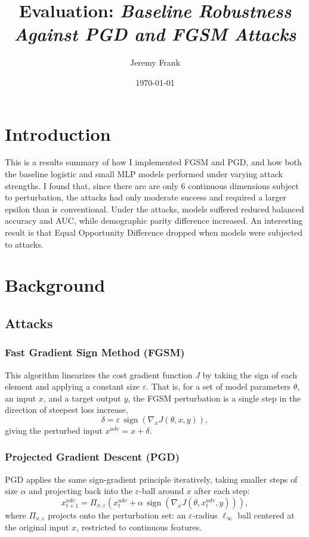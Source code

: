\documentclass[11pt]{article}
\title{Evaluation: \textit{Baseline Robustness Against PGD and FGSM Attacks}}
\author{Jeremy Frank}
\date{\today}
\begin{document}
\maketitle

\section*{Introduction}

This is a results summary of how I implemented FGSM and PGD, and how both the baseline logistic and small MLP models performed under varying attack strengths. I found that, since there are are only 6 continuous dimensions subject to perturbation, the attacks had only moderate success and required a larger epsilon than is conventional. Under the attacks, models suffered reduced balanced accuracy and AUC, while demographic parity difference increased. An interesting result is that Equal Opportunity Difference dropped when models were subjected to attacks.

\section*{Background}

\subsection*{Attacks}

\subsubsection*{Fast Gradient Sign Method (FGSM)}

This algorithm linearizes the cost gradient function $J$ by taking the sign of each element and applying a constant size $\varepsilon$. That is, for a set of model parameters $\theta$, an input $x$, and a target output $y$, the FGSM perturbation is a single step in the direction of steepest loss increase,
$$\delta = \varepsilon\,\operatorname{sign}\!\left(\nabla_x J(\theta, x, y)\right),$$
giving the perturbed input $x^{adv} = x + \delta$.

\subsubsection*{Projected Gradient Descent (PGD)}
PGD applies the same sign-gradient principle iteratively, taking smaller steps of
size $\alpha$ and projecting back into the $\varepsilon$-ball around $x$ after each step:
$$x^{adv}_{t+1} = \Pi_{x,\varepsilon}\!\left(x^{adv}_t + \alpha\,\operatorname{sign}\!\left(\nabla_x J(\theta, x^{adv}_t, y)\right)\right),$$
where $\Pi_{x,\varepsilon}$ projects onto the perturbation set: an $\varepsilon$-radius
$\ell_\infty$ ball centered at the original input $x$, restricted to continuous features.
 
\end{document}

